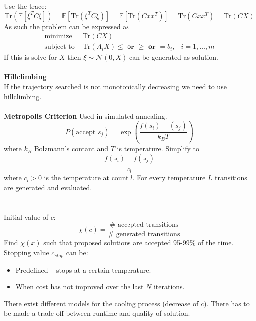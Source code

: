 \documentclass[12pt,a4paper]{report}
\begin{document}
Use the trace:
\begin{equation}
\mathrm{Tr}(\mathbb{E}[\xi^TC\xi])=\mathbb{E}[\mathrm{Tr}(\xi^TC\xi)]=\mathbb{E}[\mathrm{Tr}(Cxx^T)]=\mathrm{Tr}(Cxx^T)=\mathrm{Tr}(CX)
\end{equation}
As such the problem can be expressed as
\begin{align*}
\text{minimize }&\mathrm{Tr}(CX)\\
\text{subject to }&\mathrm{Tr}(A_iX)\leq\textbf{ or }\geq\textbf{ or }=b_i,&i=1,\ldots,m
\end{align*}
If this is solve for $X$ then $\xi\sim\mathcal{N}(0,X)$ can be generated as solution.
\clearpage
{}\\\\
\textbf{Hillclimbing}\\
If the trajectory searched is not monotonically decreasing we need to use hillclimbing.\\\\
\textbf{Metropolis Criterion}
Used in simulated annealing.
\begin{equation}
P(\text{accept }s_j)=\exp\left(\frac{f(s_i)-(s_j)}{k_BT}\right)
\end{equation}
where $k_B$ Bolzmann's contant and $T$ is temperature. Simplify to
\begin{equation}
\frac{f(s_i)-f(s_j)}{c_l}
\end{equation}
where $c_l>0$ is the temperature at count $l$. For every temperature $L$ transitions are generated and evaluated.\\\\
\\
Initial value of $c$:
\begin{equation}
\chi(c)=\frac{\#\text{ accepted transitions}}{\#\text{ generated transitions}}
\end{equation}
Find $\chi(x)$ such that proposed solutions are accepted 95-99\% of the time.\\
Stopping value $c_{stop}$ can be:
\begin{itemize}
\item Predefined -- stops at a certain temperature.
\item When cost has not improved over the last $N$ iterations.
\end{itemize}
There exist different models for the cooling process (decrease of $c$). There has to be made a trade-off between runtime and quality of solution.\\\\
\end{document}
